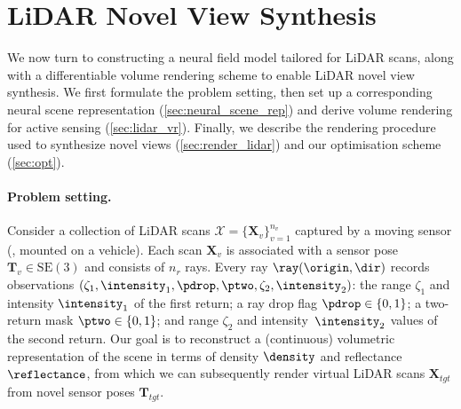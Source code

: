 \section{LiDAR Novel View Synthesis}
\label{sec:method}

We now turn to constructing a neural field model tailored for LiDAR scans, along with a differentiable volume rendering scheme to enable LiDAR novel view synthesis.
We first formulate the problem setting, then set up a corresponding neural scene representation (\cref{sec:neural_scene_rep}) and derive volume rendering for active sensing (\cref{sec:lidar_vr}). Finally, we describe the rendering procedure used to synthesize novel views (\cref{sec:render_lidar}) and our optimisation scheme (\cref{sec:opt}). 


\paragraph{Problem setting.}
Consider a collection of LiDAR scans $\mathcal{X} = \{\mathbf{X}_v\}_{v=1}^{n_v}$ captured by a moving sensor (\eg, mounted on a vehicle). Each scan $\mathbf{X}_v$ is associated with a sensor pose $\mathbf{T}_v \in \text{SE}(3)$ and consists of $n_r$ rays. Every ray $\ray(\origin, \dir)$ records observations $(\zeta_1, \intensity_1, \pdrop, \ptwo, \zeta_2, \intensity_2)$: the range $\zeta_1$ and intensity $\intensity_1$ of the first return; a ray drop flag $\pdrop \in \{0, 1\}$; a two-return mask $\ptwo \in \{0,1\}$; and range $\zeta_2$ and intensity~$\intensity_2$ values of the second return.
Our goal is to reconstruct a (continuous) volumetric representation of the scene in terms of density $\density$ and reflectance $\reflectance$, from which we can subsequently render virtual LiDAR scans $\mathbf{X}_{tgt}$ from novel sensor poses $\mathbf{T}_{tgt}$.

